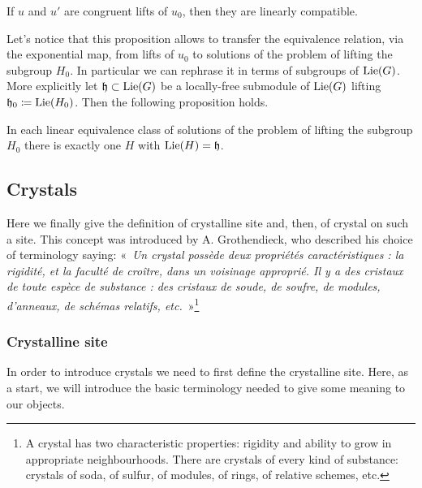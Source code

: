\begin{lem}\label{lem:CongruentLinComp}
	If $u$ and $u'$ are congruent lifts of $u_0$, then
	they are linearly compatible.
\end{lem} 


\begin{rem}[]
	Let's notice that this proposition allows to
	transfer the equivalence relation, via the exponential map,
	from lifts of $u_0$ to solutions of the problem of lifting
	the subgroup $H_0$.
	In particular we can rephrase it in terms of subgroups
	of $\operatorname{Lie}(G)$. More explicitly
	let $\mathfrak{h} \subset \operatorname{Lie}(G)$ be a locally-free
	submodule of $\operatorname{Lie}(G)$ lifting
	$\mathfrak{h}_0 \coloneqq \operatorname{Lie}(H_0)$.
	Then the following proposition holds.
\end{rem}


\begin{prop}\label{prop:equivClassFiltration}
	In each linear equivalence class of solutions of
	the problem of lifting the subgroup $H_0$
	there is exactly one $H$ with 
	$\operatorname{Lie}(H) = \mathfrak{h}$.
\end{prop}



\subsection{Crystals}
Here we finally give the definition of crystalline site and, then, of
crystal on such a site.
This concept was introduced by A. Grothendieck, 
who described his choice of terminology saying:
«~\emph{Un crystal possède deux propriétés caractéristiques : la rigidité, 
et la faculté de croître, dans un voisinage approprié. 
Il y a des cristaux de toute espèce de substance : des cristaux de soude, 
de soufre, de modules, d'anneaux, de schémas relatifs, etc.}~»\footnote{A
crystal has two characteristic properties: rigidity and ability to grow
in appropriate neighbourhoods.
There are crystals of every kind of substance: crystals of soda, of sulfur,
of modules, of rings, of relative schemes, etc.}



\subsubsection{Crystalline site}
In order to introduce crystals we need to first define the crystalline site.
Here, as a start, we will introduce the basic terminology needed to give
some meaning to our objects.


